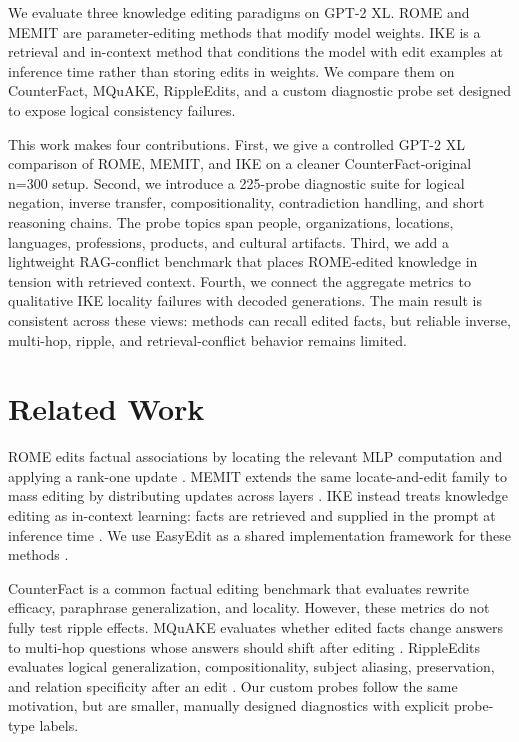 \documentclass[11pt]{article}
\begin{document}
We evaluate three knowledge editing paradigms on GPT-2 XL. ROME and MEMIT are parameter-editing methods that modify model weights. IKE is a retrieval and in-context method that conditions the model with edit examples at inference time rather than storing edits in weights. We compare them on CounterFact, MQuAKE, RippleEdits, and a custom diagnostic probe set designed to expose logical consistency failures.

This work makes four contributions. First, we give a controlled GPT-2 XL comparison of ROME, MEMIT, and IKE on a cleaner CounterFact-original n=300 setup. Second, we introduce a 225-probe diagnostic suite for logical negation, inverse transfer, compositionality, contradiction handling, and short reasoning chains. The probe topics span people, organizations, locations, languages, professions, products, and cultural artifacts. Third, we add a lightweight RAG-conflict benchmark that places ROME-edited knowledge in tension with retrieved context. Fourth, we connect the aggregate metrics to qualitative IKE locality failures with decoded generations. The main result is consistent across these views: methods can recall edited facts, but reliable inverse, multi-hop, ripple, and retrieval-conflict behavior remains limited.

\section{Related Work}

ROME edits factual associations by locating the relevant MLP computation and applying a rank-one update \citep{meng2022rome}. MEMIT extends the same locate-and-edit family to mass editing by distributing updates across layers \citep{meng2023memit}. IKE instead treats knowledge editing as in-context learning: facts are retrieved and supplied in the prompt at inference time \citep{zheng2023ike}. We use EasyEdit as a shared implementation framework for these methods \citep{wang2024easyedit}.

CounterFact is a common factual editing benchmark that evaluates rewrite efficacy, paraphrase generalization, and locality. However, these metrics do not fully test ripple effects. MQuAKE evaluates whether edited facts change answers to multi-hop questions whose answers should shift after editing \citep{zhong2023mquake}. RippleEdits evaluates logical generalization, compositionality, subject aliasing, preservation, and relation specificity after an edit \citep{cohen2024ripple}. Our custom probes follow the same motivation, but are smaller, manually designed diagnostics with explicit probe-type labels.
\end{document}
